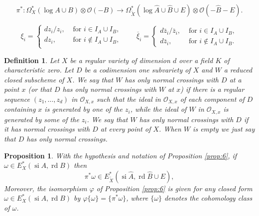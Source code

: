 \documentclass[10pt,a4paper]{amsart}
\newtheorem{prop}{Proposition}
\newtheorem{df}{Definition}
\newcommand{\caO}{\mathcal{O}}
\DeclareMathOperator{\rd}{rd}
\DeclareMathOperator{\si}{si}
\begin{document}
  \begin{equation}\label{eq:25}
    \pi ^{\ast}\colon
    \Omega ^{\ast}_{X}(\log A\cup B)\otimes \caO(-B)\longrightarrow
    \Omega ^{\ast}_{\widetilde X}(\log \widehat A\cup \widehat B\cup
    E)\otimes \caO(-\widehat B-E).
  \end{equation}

\begin{equation}\label{eq:13}
  \xi_i =
  \begin{cases}
    dz_i/z_i,&\text{ for }i\in I_A\cup I_B,\\
    dz_i,&\text{ for }i\not \in I_A\cup I_B,\\    
  \end{cases}
  \qquad
  \overline{\xi}_i =
  \begin{cases}
    d\bar z_i/\bar z_i,&\text{ for }i\in I_A\cup I_B,\\
    d \bar z_i,&\text{ for }i\not \in I_A\cup I_B.
  \end{cases}
\end{equation}

\begin{df}\label{def:6} Let $X$ be a regular variety of dimension $d$ over a field $K$ of
  characteristic zero.  Let $D$ be a codimension one subvariety  of $X$ and $W$ a
  reduced closed subscheme of $X$. We say that $W$ \emph{has only
    normal crossings with}
  $D$ \emph{at a point} $x$ (or that $D$ has only normal crossings
  with $W$ at $x$) if there is a regular sequence
  $(z_{1},\dots,z_{d})$ in $\caO_{X,x}$   such that the ideal in $\caO_{X,x}$ of each
  component of $D$ containing $x$ is generated by one of the $z_{i}$,
  while the ideal of $W$ in $\caO_{X,x}$ is generated by some of the
  $z_{i}$. We say that $W$ \emph{has only normal crossings with} $D$
  if it has normal crossings with $D$ at every point of $X$. When $W$
  is empty we just say that $D$ has \emph{only normal crossings}.
\end{df}

\begin{prop}\label{prop:5} With the hypothesis and notation of
  Proposition \ref{prop:6},  if $\omega\in E_{X}^\ast(\si A,\rd B)$ then
  \begin{displaymath}
    \pi ^\ast\omega \in E_{\widetilde X}^\ast(\si \widehat A,\rd \widehat B\cup E),
  \end{displaymath}
  Moreover, the isomorphism $\varphi $ of Proposition \ref{prop:6} is
  given for any closed form $\omega \in E_{X}^\ast(\si A,\rd B)$ by
  $\varphi\{\omega\}=\{\pi ^{\ast}\omega\}$, where $\{\omega\}$
  denotes the cohomology class of $\omega$.
\end{prop}
\end{document}
